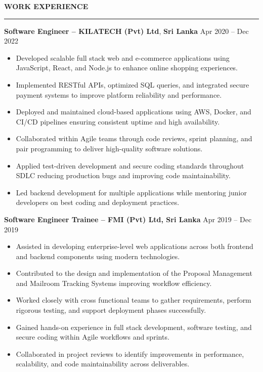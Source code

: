 \documentclass[10pt,letterpaper]{article}
\begin{document}
\vspace{8pt}

\textbf{WORK EXPERIENCE}\\[-8pt]
\noindent\rule{\textwidth}{1pt}

\vspace{-2pt}

\textbf{Software Engineer -- KILATECH (Pvt) Ltd}, \textbf{Sri Lanka} \hfill Apr 2020 -- Dec 2022

\vspace{-1pt}

\begin{itemize}
\item Developed scalable full stack web and e-commerce applications using JavaScript, React, and Node.js to enhance online shopping experiences.
\item Implemented RESTful APIs, optimized SQL queries, and integrated secure payment systems to improve platform reliability and performance.
\item Deployed and maintained cloud-based applications using AWS, Docker, and CI/CD pipelines ensuring consistent uptime and high availability.
\item Collaborated within Agile teams through code reviews, sprint planning, and pair programming to deliver high-quality software solutions.
\item Applied test-driven development and secure coding standards throughout SDLC reducing production bugs and improving code maintainability.
\item Led backend development for multiple applications while mentoring junior developers on best coding and deployment practices.
\end{itemize}

\textbf{Software Engineer Trainee -- FMI (Pvt) Ltd, Sri Lanka} \hfill Apr 2019 -- Dec 2019

\vspace{-1pt}

\begin{itemize}
\item Assisted in developing enterprise-level web applications across both frontend and backend components using modern technologies.
\item Contributed to the design and implementation of the Proposal Management and Mailroom Tracking Systems improving workflow efficiency.
\item Worked closely with cross functional teams to gather requirements, perform rigorous testing, and support deployment phases successfully.
\item Gained hands-on experience in full stack development, software testing, and secure coding within Agile workflows and sprints.
\item Collaborated in project reviews to identify improvements in performance, scalability, and code maintainability across deliverables.
\end{itemize}
\end{document}
